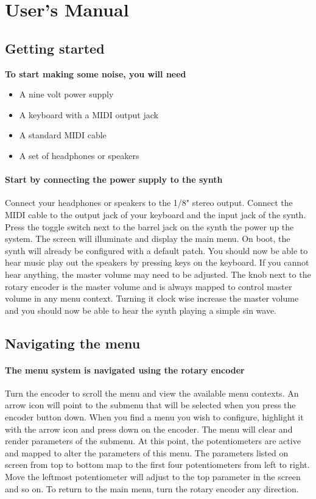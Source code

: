 \documentclass[acmlarge,screen]{acmart}
\begin{document}



\pagebreak


\appendix

\section{User's Manual}
\subsection{Getting started}
\textbf{To start making some noise, you will need}
\begin{itemize}
	\item A nine volt power supply
	\item A keyboard with a MIDI output jack
	\item A standard MIDI cable
	\item A set of headphones or speakers
\end{itemize}
\paragraph{Start by connecting the power supply to the synth} Connect your headphones or speakers to the 1/8" stereo output. Connect the MIDI cable to the output jack of your keyboard and the input jack of the synth. Press the toggle switch next to the barrel jack on the synth the power up the system. The screen will illuminate and display the main menu. On boot, the synth will already be configured with a default patch. You should now be able to hear music play out the speakers by pressing keys on the keyboard. If you cannot hear anything, the master volume may need to be adjusted. The knob next to the rotary encoder is the master volume and is always mapped to control master volume in any menu context. Turning it clock wise increase the master volume and you should now be able to hear the synth playing a simple sin wave.

\subsection{Navigating the menu}
\paragraph{The menu system is navigated using the rotary encoder} Turn the encoder to scroll the menu and view the available menu contexts. An arrow icon will point to the submenu that will be selected when you press the encoder button down. When you find a menu you wish to configure, highlight it with the arrow icon and press down on the encoder. The menu will clear and render parameters of the submenu. At this point, the potentiometers are active and mapped to alter the parameters of this menu. The parameters listed on screen from top to bottom map to the first four potentiometers from left to right. Move the leftmost potentiometer will adjust to the top parameter in the screen and so on. To return to the main menu, turn the rotary encoder any direction.
\end{document}
